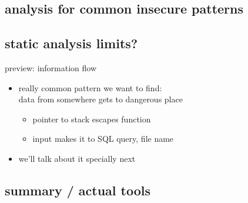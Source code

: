 \subsection{analysis for common insecure patterns}


\subsection{static analysis limits?}


\begin{frame}{preview: information flow}
    \begin{itemize}
    \item really common pattern we want to find: \\
        data from somewhere gets to dangerous place
        \begin{itemize}
        \item pointer to stack escapes function
        \item input makes it to SQL query, file name
        \end{itemize}
    \item we'll talk about it specially next
    \end{itemize}
\end{frame}

\subsection{summary / actual tools}



